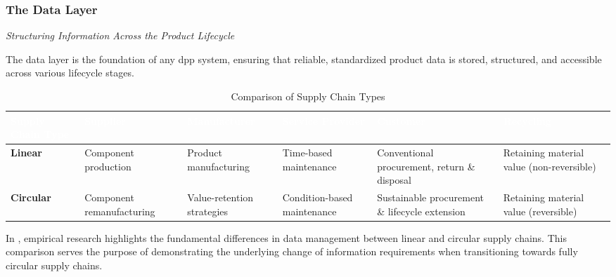 \subsubsection{The Data Layer}
\textit{Structuring Information Across the Product Lifecycle}

The data layer is the foundation of any \ac{dpp} system, ensuring that reliable, standardized product data is stored, structured, and accessible across various lifecycle stages. 

\begin{table}[htbp]
    \centering
    \small
    \caption{Comparison of Supply Chain Types}
    \renewcommand{\arraystretch}{1.2}
    \begin{tabularx}{\linewidth}{
        |>{\centering\arraybackslash}X
        |>{\centering\arraybackslash}X
        |>{\centering\arraybackslash}X
        |>{\centering\arraybackslash}X
        |>{\centering\arraybackslash}X
        |>{\centering\arraybackslash}X|}
        \hline
        \cellcolor{myDarkBlue}\textcolor{white}{\textbf{Supply Chain Type}} & 
        \cellcolor{myDarkBlue}\textcolor{white}{\textbf{Supplier}} & 
        \cellcolor{myDarkBlue}\textcolor{white}{\textbf{Manufacturer}} & 
        \cellcolor{myDarkBlue}\textcolor{white}{\textbf{Service Provider}} & 
        \cellcolor{myDarkBlue}\textcolor{white}{\textbf{Customer}} & 
        \cellcolor{myDarkBlue}\textcolor{white}{\textbf{Recycling}} \\
        \hline
        \cellcolor{myGrey}\textbf{Linear} & 
        Component production & 
        Product manufacturing & 
        Time-based maintenance & 
        Conventional procurement, return \& disposal & 
        Retaining material value (non-reversible) \\
        \hline
        \cellcolor{myGrey}\textbf{Circular} & 
        Component remanufacturing & 
        Value-retention strategies & 
        Condition-based maintenance & 
        Sustainable procurement \& lifecycle extension & 
        Retaining material value (reversible) \\
        \hline
    \end{tabularx}
    \label{tab:supply_chain_comparison}
\end{table}

In , empirical research highlights the fundamental differences in data management between linear and circular supply chains. This comparison serves the purpose of demonstrating the underlying change of information requirements when transitioning towards fully circular supply chains. \autocite{Jensen.2024}

